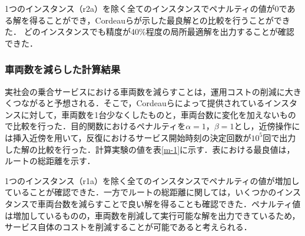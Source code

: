 \documentclass[a4j，11pt，twocolumn]{jsarticle}
\begin{document}
1つのインスタンス（r2a）を除く全てのインスタンスでペナルティの値が0である解を得ることができ，Cordeauらが示した最良解との比較を行うことができた．
どのインスタンスでも精度が40\%程度の局所最適解を出力することが確認できた．

\subsubsection{車両数を減らした計算結果}
実社会の乗合サービスにおける車両数を減らすことは，運用コストの削減に大きくつながると予想される．そこで，Cordeauらによって提供されているインスタンスに対して，車両数を1台少なくしたものと，車両台数に変化を加えないもので比較を行った．目的関数におけるペナルティを$\alpha=1，\beta=1$とし，近傍操作には挿入近傍を用いて，反復におけるサービス開始時刻の決定回数が$10^5$回で出力した解の比較を行った．計算実験の値を表\ref{m-1}に示す．表における最良値は，ルートの総距離を示す．

1つのインスタンス（r1a）を除く全てのインスタンスでペナルティの値が増加していることが確認できた．一方でルートの総距離に関しては，いくつかのインスタンスで車両台数を減らすことで良い解を得ることも確認できた．ペナルティ値は増加しているものの，車両数を削減して実行可能な解を出力できているため，サービス自体のコストを削減することが可能であると考えられる．
\end{document}
